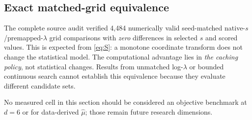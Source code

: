 \subsection{Exact matched-grid equivalence}
The complete source audit verified 4,484 numerically valid seed-matched native-$s$/premapped-$\lambda$ grid comparisons with \emph{zero} differences in selected $s$ and scored values. This is expected from \eqref{eq:S}: a monotone coordinate transform does not change the statistical model. The computational advantage lies in \emph{the caching policy}, not statistical changes. Results from unmatched log-$\lambda$ or bounded continuous search cannot establish this equivalence because they evaluate different candidate sets.

No measured cell in this section should be considered an objective benchmark at $d=6$ or for data-derived $\widehat\mu$; those remain future research dimensions.
